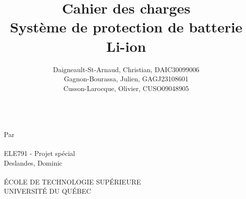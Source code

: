 
\title{
	\textbf{Cahier des charges} \\
	\vspace{2cm}
	Système de protection de batterie Li-ion	
	}
\author{
	Daigneault-St-Arnaud, Christian, DAIC30099006 \\
	Gagnon-Bourassa, Julien, GAGJ23108601 \\
	Cusson-Larocque, Olivier, CUSO09048905	
}
\newcommand{\cours}{ELE791 - Projet spécial }
\newcommand{\prof}{Deslandes, Dominic}



\makeatletter
\begin{titlepage}


	\centering
	{\Huge \@title}\\ 
	\vspace{2cm}
	{\large Par \\
		\vspace{0.5cm}
		\@author \\
		\vspace{2cm}
		\cours \\
		\vspace{0.5cm}
		\prof \\
		\vspace{3.0cm}
		\@date \\
		\vspace{3.0cm}
		\'{E}COLE DE TECHNOLOGIE SUP\'{E}RIEURE \\
		UNIVERSIT\'{E} DU QUÉBEC
	}
\end{titlepage}
\makeatother




